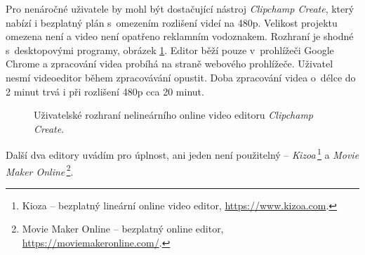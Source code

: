 Pro nenáročné uživatele by mohl být dostačující nástroj \textit{Clipchamp Create}, který nabízí i bezplatný plán s~omezením rozlišení videí na 480p. Velikost projektu omezena není a video není opatřeno reklamním vodoznakem. Rozhraní je shodné s~desktopovými programy, obrázek \ref{img:clipchamp}. Editor běží pouze v~prohlížeči Google Chrome a zpracování videa probíhá na straně webového prohlížeče. Uživatel nesmí videoeditor během zpracovávání opustit. Doba zpracování videa o~délce do 2 minut trvá i při rozlišení 480p cca 20 minut.
\begin{figure}[h]
	\centering
	\caption{Uživatelské rozhraní nelineárního online video editoru \textit{Clipchamp Create}.}\label{img:clipchamp}
\end{figure}

Další dva editory uvádím pro úplnost, ani jeden není použitelný -- \textit{Kizoa}\,\footnote{Kioza -- bezplatný lineární online video editor, \url{https://www.kizoa.com}.} a \textit{Movie Maker Online}\,\footnote{Movie Maker Online -- bezplatný online editor, \url{https://moviemakeronline.com/}.}.

